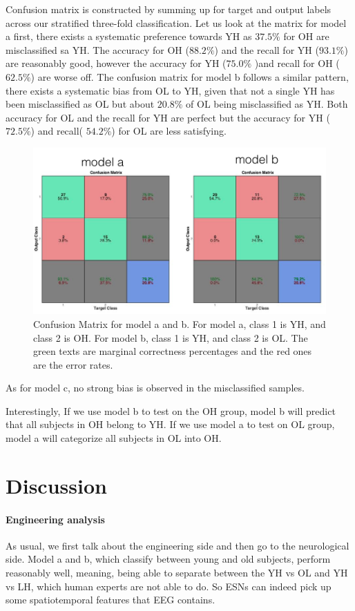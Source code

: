 \documentclass[a4paper,11pt,oneside]{article}
\begin{document}
Confusion matrix is constructed by summing up for target and output labels across our stratified three-fold classification. Let us look at the matrix for model a first, there exists a systematic preference towards YH as $37.5\%$ for OH are misclassified sa YH. The accuracy for OH ($88.2\%$) and the recall for YH ($93.1\%$) are reasonably good, however the accuracy for YH ($75.0\%$ )and recall for OH ($62.5\%$) are worse off.
The confusion matrix for model b follows a similar pattern, there exists a systematic bias from OL to YH, given that not a single YH has been misclassified as OL but about $20.8\%$ of OL being misclassified as YH. Both accuracy for OL and the recall for YH are perfect but the accuracy for YH ($72.5\%$) and recall( $54.2\%$) for OL are less satisfying.
\begin{figure}[h!]
	\centering
	\includegraphics[width=\textwidth]{img/confusion}
	\caption{Confusion Matrix for model a and b. For model a, class 1 is YH, and class 2 is OH. For model b, class 1 is YH, and class 2 is OL. The green texts are marginal correctness percentages and the red ones are the error rates.}
\end{figure}
As for model c, no strong bias is observed in the misclassified samples.

Interestingly, If we use model b to test on the OH group, model b will predict that all subjects in OH belong to YH. If we use model a to test on OL group, model a will categorize all subjects in OL into OH.


\section{Discussion}
\paragraph{Engineering analysis}
As usual, we first talk about the engineering side and then go to the neurological side.  Model a and b, which classify between young and old subjects, perform reasonably well, meaning, being able to separate between the YH vs OL and YH vs LH, which human experts are not able to do. So ESNs can indeed pick up some spatiotemporal features that EEG contains.
 
\end{document}
